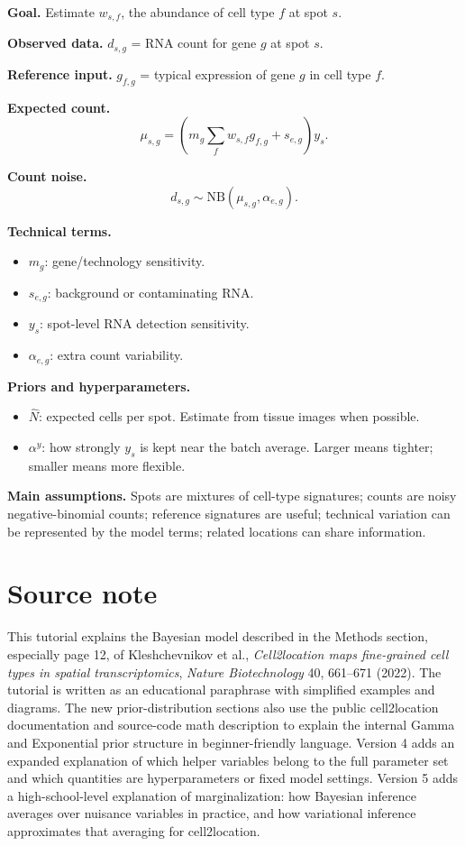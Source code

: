 \documentclass[11pt]{article}
\newcommand{\NB}{\mathrm{NB}}
\begin{document}
\begin{tcolorbox}[colback=softblue,colframe=deepblue,title=Cell2location page-12 model cheat sheet,fonttitle=\bfseries,breakable]
\textbf{Goal.} Estimate $w_{s,f}$, the abundance of cell type $f$ at spot $s$.

\textbf{Observed data.} $d_{s,g}$ = RNA count for gene $g$ at spot $s$.

\textbf{Reference input.} $g_{f,g}$ = typical expression of gene $g$ in cell type $f$.

\textbf{Expected count.}
\[
\mu_{s,g}=\left(m_g\sum_f w_{s,f}g_{f,g}+s_{e,g}\right)y_s.
\]

\textbf{Count noise.}
\[
d_{s,g}\sim \NB(\mu_{s,g},\alpha_{e,g}).
\]

\textbf{Technical terms.}
\begin{itemize}
  \item $m_g$: gene/technology sensitivity.
  \item $s_{e,g}$: background or contaminating RNA.
  \item $y_s$: spot-level RNA detection sensitivity.
  \item $\alpha_{e,g}$: extra count variability.
\end{itemize}

\textbf{Priors and hyperparameters.}
\begin{itemize}
  \item $\hat N$: expected cells per spot. Estimate from tissue images when possible.
  \item $\alpha^y$: how strongly $y_s$ is kept near the batch average. Larger means tighter; smaller means more flexible.
\end{itemize}

\textbf{Main assumptions.}
Spots are mixtures of cell-type signatures; counts are noisy negative-binomial counts; reference signatures are useful; technical variation can be represented by the model terms; related locations can share information.
\end{tcolorbox}

\section*{Source note}
This tutorial explains the Bayesian model described in the Methods section, especially page 12, of Kleshchevnikov et al., \emph{Cell2location maps fine-grained cell types in spatial transcriptomics}, \emph{Nature Biotechnology} 40, 661--671 (2022). The tutorial is written as an educational paraphrase with simplified examples and diagrams. The new prior-distribution sections also use the public cell2location documentation and source-code math description to explain the internal Gamma and Exponential prior structure in beginner-friendly language. Version 4 adds an expanded explanation of which helper variables belong to the full parameter set and which quantities are hyperparameters or fixed model settings. Version 5 adds a high-school-level explanation of marginalization: how Bayesian inference averages over nuisance variables in practice, and how variational inference approximates that averaging for cell2location.
\end{document}

